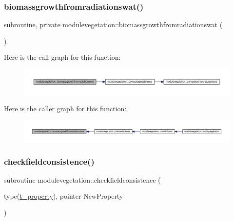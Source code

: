 \subsubsection{\texorpdfstring{biomassgrowthfromradiationswat()}{biomassgrowthfromradiationswat()}}
{\footnotesize\ttfamily subroutine, private modulevegetation\+::biomassgrowthfromradiationswat (\begin{DoxyParamCaption}{ }\end{DoxyParamCaption})\hspace{0.3cm}{\ttfamily [private]}}

Here is the call graph for this function\+:\nopagebreak
\begin{figure}[H]
\begin{center}
\leavevmode
\includegraphics[width=350pt]{namespacemodulevegetation_a156df3425609d782754520991389dc1a_cgraph}
\end{center}
\end{figure}
Here is the caller graph for this function\+:\nopagebreak
\begin{figure}[H]
\begin{center}
\leavevmode
\includegraphics[width=350pt]{namespacemodulevegetation_a156df3425609d782754520991389dc1a_icgraph}
\end{center}
\end{figure}
\mbox{\label{namespacemodulevegetation_ac0764a40d57c0889573171b3f85afbf3}} 
\subsubsection{\texorpdfstring{checkfieldconsistence()}{checkfieldconsistence()}}
{\footnotesize\ttfamily subroutine modulevegetation\+::checkfieldconsistence (\begin{DoxyParamCaption}\item[{type(\mbox{\hyperlink{structmodulevegetation_1_1t__property}{t\+\_\+property}}), pointer}]{New\+Property }\end{DoxyParamCaption})\hspace{0.3cm}{\ttfamily [private]}}


